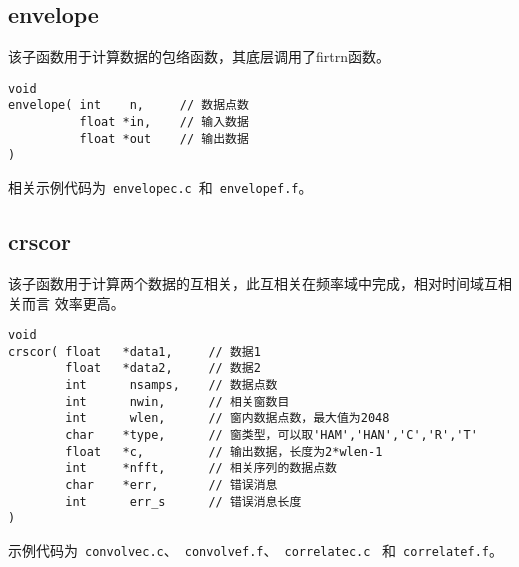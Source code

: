 \subsection{envelope}
该子函数用于计算数据的包络函数，其底层调用了firtrn函数。
\begin{verbatim}
void                                                                                
envelope( int    n,     // 数据点数
          float *in,    // 输入数据
          float *out    // 输出数据
)
\end{verbatim}

相关示例代码为~\verb+envelopec.c+~和~\verb+envelopef.f+。

\subsection{crscor}
该子函数用于计算两个数据的互相关，此互相关在频率域中完成，相对时间域互相关而言
效率更高。

\begin{verbatim}
void                                                                                  
crscor( float   *data1,     // 数据1
        float   *data2,     // 数据2                                       
        int      nsamps,    // 数据点数                                               
        int      nwin,      // 相关窗数目                                            
        int      wlen,      // 窗内数据点数，最大值为2048
        char    *type,      // 窗类型，可以取'HAM','HAN','C','R','T'
        float   *c,         // 输出数据，长度为2*wlen-1
        int     *nfft,      // 相关序列的数据点数                            
        char    *err,       // 错误消息                                  
        int      err_s      // 错误消息长度
)
\end{verbatim}

示例代码为~\verb+convolvec.c+、~\verb+convolvef.f+、~\verb+correlatec.c+~
和~\verb+correlatef.f+。
